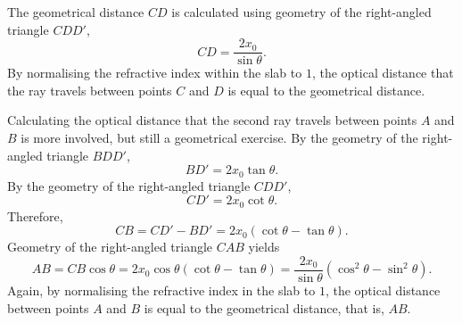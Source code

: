 \documentclass[12pt]{../style-files/ociamthesis}
\begin{document}
	The geometrical distance $CD$ is calculated using geometry of the right-angled triangle $CDD'$,	\begin{equation}
	CD = \frac{2x_0}{\sin{\theta}}.
	\end{equation}
	By normalising the refractive index within the slab to $1$, the optical distance that the ray travels between points $C$ and $D$ is equal to the geometrical distance.
	
	Calculating the optical distance that the second ray travels between points $A$ and $B$ is more involved, but still a geometrical exercise. By the geometry of the right-angled triangle $BDD'$,
	\begin{equation}
	BD' = 2x_0\tan{\theta}.
	\end{equation}
	By the geometry of the right-angled triangle $CDD'$,
	\begin{equation}
	CD' = 2x_0\cot{\theta}.
	\end{equation}
	Therefore,
	\begin{equation}
	CB = CD' - BD' = 2x_0(\cot{\theta} - \tan{\theta}).
	\end{equation}
	Geometry of the right-angled triangle $CAB$ yields
	\begin{equation}
	AB = CB \cos{\theta} = 2x_0\cos{\theta}(\cot{\theta} - \tan{\theta}) = \frac{2x_0}{\sin{\theta}}(\cos^2{\theta} - \sin^2{\theta}).
	\end{equation}
	Again, by normalising the refractive index in the slab to $1$, the optical distance between points $A$ and $B$ is equal to the geometrical distance, that is, $AB$.
	
\end{document}
